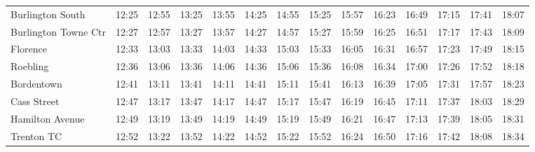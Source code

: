\begin{center}
\begin{tabular}{@{}lrrrrrrrrrrrrr@{}}
Burlington South & 12:25 & 12:55 & 13:25 & 13:55 & 14:25 & 14:55 & 15:25 & 15:57 & 16:23 & 16:49 & 17:15 & 17:41 & 18:07 \\
Burlington Towne Ctr & 12:27 & 12:57 & 13:27 & 13:57 & 14:27 & 14:57 & 15:27 & 15:59 & 16:25 & 16:51 & 17:17 & 17:43 & 18:09 \\
Florence & 12:33 & 13:03 & 13:33 & 14:03 & 14:33 & 15:03 & 15:33 & 16:05 & 16:31 & 16:57 & 17:23 & 17:49 & 18:15 \\
Roebling & 12:36 & 13:06 & 13:36 & 14:06 & 14:36 & 15:06 & 15:36 & 16:08 & 16:34 & 17:00 & 17:26 & 17:52 & 18:18 \\
Bordentown & 12:41 & 13:11 & 13:41 & 14:11 & 14:41 & 15:11 & 15:41 & 16:13 & 16:39 & 17:05 & 17:31 & 17:57 & 18:23 \\
Cass Street & 12:47 & 13:17 & 13:47 & 14:17 & 14:47 & 15:17 & 15:47 & 16:19 & 16:45 & 17:11 & 17:37 & 18:03 & 18:29 \\
Hamilton Avenue & 12:49 & 13:19 & 13:49 & 14:19 & 14:49 & 15:19 & 15:49 & 16:21 & 16:47 & 17:13 & 17:39 & 18:05 & 18:31 \\
Trenton TC & 12:52 & 13:22 & 13:52 & 14:22 & 14:52 & 15:22 & 15:52 & 16:24 & 16:50 & 17:16 & 17:42 & 18:08 & 18:34 \\
\bottomrule\end{tabular}\end{center}

